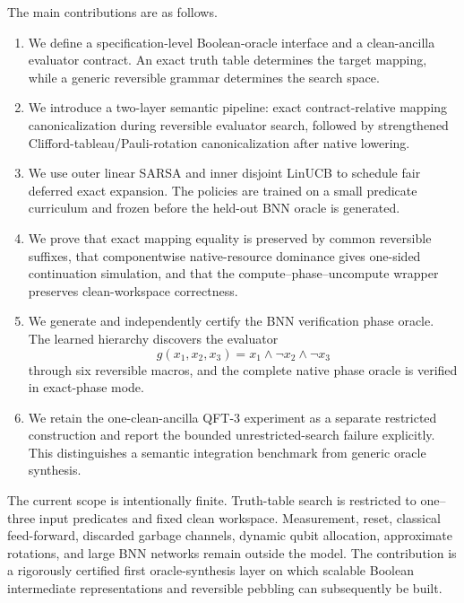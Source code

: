The main contributions are as follows.
\begin{enumerate}
\item We define a specification-level Boolean-oracle interface and a clean-ancilla evaluator contract.  An exact truth table determines the target mapping, while a generic reversible grammar determines the search space.
\item We introduce a two-layer semantic pipeline: exact contract-relative mapping canonicalization during reversible evaluator search, followed by strengthened Clifford-tableau/Pauli-rotation canonicalization after native lowering.
\item We use outer linear SARSA and inner disjoint LinUCB to schedule fair deferred exact expansion.  The policies are trained on a small predicate curriculum and frozen before the held-out BNN oracle is generated.
\item We prove that exact mapping equality is preserved by common reversible suffixes, that componentwise native-resource dominance gives one-sided continuation simulation, and that the compute--phase--uncompute wrapper preserves clean-workspace correctness.
\item We generate and independently certify the BNN verification phase oracle.  The learned hierarchy discovers the evaluator
\begin{equation}
 g(x_1,x_2,x_3)=x_1\land\neg x_2\land\neg x_3
\end{equation}
through six reversible macros, and the complete native phase oracle is verified in exact-phase mode.
\item We retain the one-clean-ancilla QFT-3 experiment as a separate restricted construction and report the bounded unrestricted-search failure explicitly.  This distinguishes a semantic integration benchmark from generic oracle synthesis.
\end{enumerate}

The current scope is intentionally finite.  Truth-table search is restricted to one--three input predicates and fixed clean workspace.  Measurement, reset, classical feed-forward, discarded garbage channels, dynamic qubit allocation, approximate rotations, and large BNN networks remain outside the model.  The contribution is a rigorously certified first oracle-synthesis layer on which scalable Boolean intermediate representations and reversible pebbling can subsequently be built.
